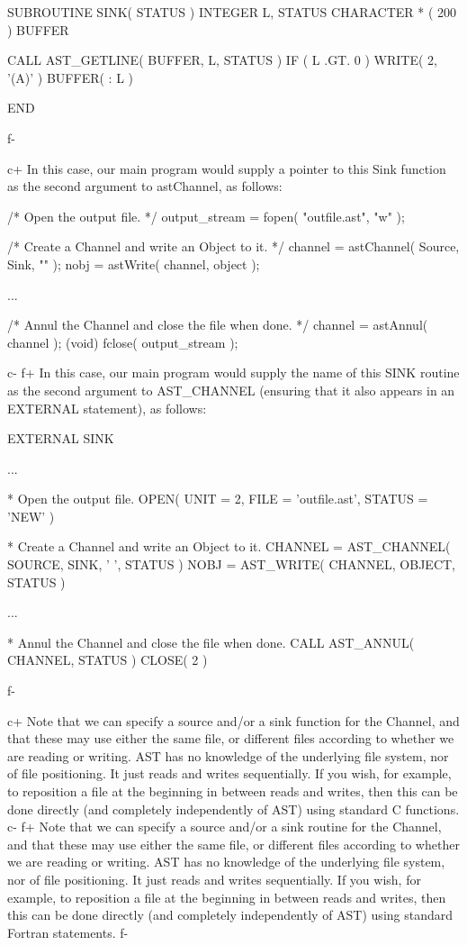 \documentclass[twoside,11pt]{starlink}
\begin{document}
{\small
\begin{terminalv}
      SUBROUTINE SINK( STATUS )
      INTEGER L, STATUS
      CHARACTER * ( 200 ) BUFFER

      CALL AST_GETLINE( BUFFER, L, STATUS )
      IF ( L .GT. 0 ) WRITE( 2, '(A)' ) BUFFER( : L )

      END
\end{terminalv}
\normalsize
f-

c+
In this case, our main program would supply a pointer to this Sink
function as the second argument to astChannel, as follows:

\small
\begin{terminalv}
/* Open the output file. */
output_stream = fopen( "outfile.ast", "w" );

/* Create a Channel and write an Object to it. */
channel = astChannel( Source, Sink, "" );
nobj = astWrite( channel, object );

   ...

/* Annul the Channel and close the file when done. */
channel = astAnnul( channel );
(void) fclose( output_stream );
\end{terminalv}
\normalsize
c-
f+
In this case, our main program would supply the name of this SINK
routine as the second argument to AST\_CHANNEL (ensuring that it also
appears in an EXTERNAL statement), as follows:

\small
\begin{terminalv}
      EXTERNAL SINK

      ...

*  Open the output file.
      OPEN( UNIT = 2, FILE = 'outfile.ast', STATUS = 'NEW' )

*  Create a Channel and write an Object to it.
      CHANNEL = AST_CHANNEL( SOURCE, SINK, ' ', STATUS )
      NOBJ = AST_WRITE( CHANNEL, OBJECT, STATUS )

      ...

*  Annul the Channel and close the file when done.
      CALL AST_ANNUL( CHANNEL, STATUS )
      CLOSE( 2 )
\end{terminalv}
\normalsize
f-

c+
Note that we can specify a source and/or a sink function for the
Channel, and that these may use either the same file, or different
files according to whether we are reading or writing. AST has no
knowledge of the underlying file system, nor of file positioning. It
just reads and writes sequentially. If you wish, for example, to
reposition a file at the beginning in between reads and writes, then
this can be done directly (and completely independently of AST) using
standard C functions.
c-
f+
Note that we can specify a source and/or a sink routine for the
Channel, and that these may use either the same file, or different
files according to whether we are reading or writing. AST has no
knowledge of the underlying file system, nor of file positioning. It
just reads and writes sequentially. If you wish, for example, to
reposition a file at the beginning in between reads and writes, then
this can be done directly (and completely independently of AST) using
standard Fortran statements.
f-

}
\end{document}
